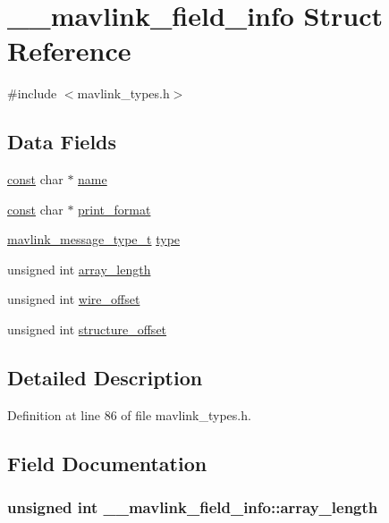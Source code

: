 \hypertarget{struct____mavlink__field__info}{\section{\-\_\-\-\_\-mavlink\-\_\-field\-\_\-info Struct Reference}
\label{struct____mavlink__field__info}
}


{\ttfamily \#include $<$mavlink\-\_\-types.\-h$>$}

\subsection*{Data Fields}
\begin{DoxyCompactItemize}
\item 
\hyperlink{group___n_a_m_e_ga7ae6d0e43244213b34de2c2b9aa30da6}{const} char $\ast$ \hyperlink{struct____mavlink__field__info_a09193c7acc510180ecf6f944381e53c2}{name}
\item 
\hyperlink{group___n_a_m_e_ga7ae6d0e43244213b34de2c2b9aa30da6}{const} char $\ast$ \hyperlink{struct____mavlink__field__info_af3fc635b6e03851bb683c0c3d57dfc12}{print\-\_\-format}
\item 
\hyperlink{mavlink__types_8h_ab6045b7adc25bdc05a5011a91dc645a4}{mavlink\-\_\-message\-\_\-type\-\_\-t} \hyperlink{struct____mavlink__field__info_a32f98e7c869ae1567c4ad366c74b6552}{type}
\item 
unsigned int \hyperlink{struct____mavlink__field__info_aa3ab268c4176743874c8d05694ed293f}{array\-\_\-length}
\item 
unsigned int \hyperlink{struct____mavlink__field__info_a7156648575e497f112fde78e851dd4d9}{wire\-\_\-offset}
\item 
unsigned int \hyperlink{struct____mavlink__field__info_acb947cd22e51e70e8b5f677b543196ac}{structure\-\_\-offset}
\end{DoxyCompactItemize}


\subsection{Detailed Description}


Definition at line 86 of file mavlink\-\_\-types.\-h.



\subsection{Field Documentation}
\hypertarget{struct____mavlink__field__info_aa3ab268c4176743874c8d05694ed293f}{
\subsubsection[{array\-\_\-length}]{\setlength{\rightskip}{0pt plus 5cm}unsigned int \-\_\-\-\_\-mavlink\-\_\-field\-\_\-info\-::array\-\_\-length}}\label{struct____mavlink__field__info_aa3ab268c4176743874c8d05694ed293f}


